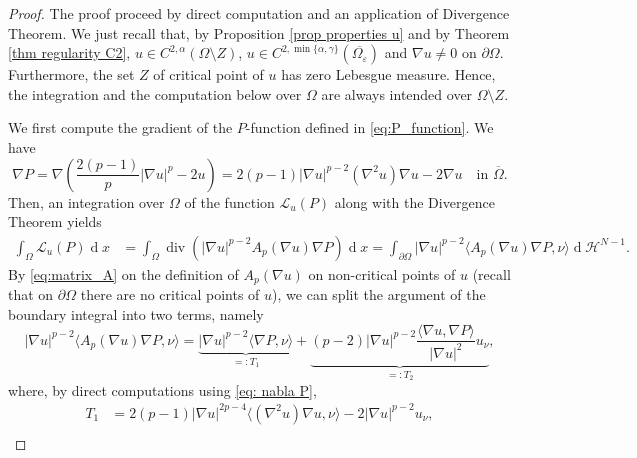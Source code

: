 \documentclass[10pt,a4paper]{amsart}
\numberwithin{equation}{section}
\renewcommand{\div}{\operatorname{div}}
\renewcommand{\d}[1]{\ensuremath{\operatorname{d}\!{#1}}}
\begin{document}
\begin{proof}
    The proof proceed by direct computation and an application of Divergence Theorem. We just recall that, by Proposition \ref{prop properties u} and by Theorem \ref{thm regularity C2}, $u \in C^{2,\alpha}(\Omega\setminus Z)$, $u \in C^{2,\min \{ \alpha,\gamma \}}(\overline{\Omega_\varepsilon})$ and $\nabla u \neq 0$ on $\partial\Omega$. Furthermore, the set $Z$ of critical point of $u$ has zero Lebesgue measure. Hence, the integration and the computation below over $\Omega$ are always intended over $\Omega \setminus Z$. 
    
    We first compute the gradient of the $P$-function defined in \eqref{eq:P_function}. We have
    \begin{equation}\label{eq: nabla P}
        \nabla P = \nabla \left( \frac{2(p-1)}{p}|\nabla u|^p - 2u \right) = 2(p-1)|\nabla u|^{p-2}(\nabla^2 u)\nabla u - 2\nabla u \quad \text{in } \overline{\Omega}.
    \end{equation}
    Then, an integration over $\Omega$ of the function $ \mathcal{L}_u(P)$ along with the Divergence Theorem yields
    \begin{equation} \label{eq:integral_L_P}
        \begin{aligned}
        \int_\Omega \mathcal{L}_u(P) \d{x} &= \int_\Omega \div \left( |\nabla u|^{p-2} A_p(\nabla u)\nabla P \right) \d{x} = \int_{\partial\Omega} |\nabla u|^{p-2} \langle A_p(\nabla u)\nabla P, \nu \rangle \d{}\mathcal{H}^{N-1}.
        \end{aligned}
    \end{equation}
    By \eqref{eq:matrix_A} on the definition of $A_p(\nabla u)$ on non-critical points of $u$ (recall that on $\partial\Omega$ there are no critical points of $u$), we can split the argument of the boundary integral into two terms, namely
    \begin{equation*}
        |\nabla u|^{p-2} \langle A_p(\nabla u)\nabla P, \nu \rangle = \underbrace{|\nabla u|^{p-2} \langle \nabla P, \nu \rangle}_{=:T_1} + \underbrace{(p-2) |\nabla u|^{p-2} \frac{\langle \nabla u, \nabla P \rangle}{|\nabla u|^2} u_\nu}_{=:T_2},
    \end{equation*}
    where, by direct computations using \eqref{eq: nabla P},
    \begin{equation*}
        \begin{aligned}
        T_1 &= 2(p-1)|\nabla u|^{2p-4}\langle (\nabla^2 u)\nabla u, \nu \rangle - 2|\nabla u|^{p-2} u_\nu, 
        \\

\end{aligned}
\end{equation*}
\end{proof}
\end{document}
